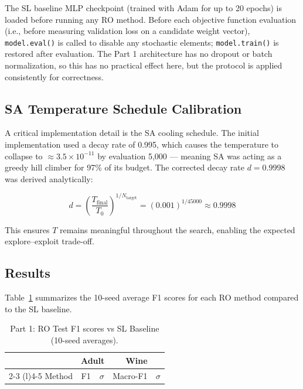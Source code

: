 \documentclass[letterpaper, 10 pt, conference]{ieeeconf}
\begin{document}
The SL baseline MLP checkpoint (trained with Adam for up to 20 epochs) is loaded before running any RO method. Before each objective function evaluation (i.e., before measuring validation loss on a candidate weight vector), \texttt{model.eval()} is called to disable any stochastic elements; \texttt{model.train()} is restored after evaluation. The Part 1 architecture has no dropout or batch normalization, so this has no practical effect here, but the protocol is applied consistently for correctness.

\subsection{SA Temperature Schedule Calibration}

A critical implementation detail is the SA cooling schedule. The initial implementation used a decay rate of 0.995, which causes the temperature to collapse to $\approx 3.5 \times 10^{-11}$ by evaluation 5{,}000 --- meaning SA was acting as a greedy hill climber for 97\% of its budget. The corrected decay rate $d = 0.9998$ was derived analytically:

\begin{equation}
d = \left(\frac{T_{\text{final}}}{T_0}\right)^{1/N_{\text{target}}} = (0.001)^{1/45000} \approx 0.9998
\end{equation}

This ensures $T$ remains meaningful throughout the search, enabling the expected explore--exploit trade-off.

\subsection{Results}

Table~\ref{tab:part1} summarizes the 10-seed average F1 scores for each RO method compared to the SL baseline.

\begin{table}[!htbp]
    \centering
    \caption{Part 1: RO Test F1 scores vs SL Baseline (10-seed averages).}
    \label{tab:part1}
    \setlength{\tabcolsep}{3pt}
    \begin{tabular}{@{}lcccc@{}}
    \toprule
    & \multicolumn{2}{c}{\textbf{Adult}} & \multicolumn{2}{c}{\textbf{Wine}} \\
    \cmidrule(lr){2-3} \cmidrule(l){4-5}
    Method & F1 & $\sigma$ & Macro-F1 & $\sigma$ \\
    \midrule
    
    \bottomrule
    \end{tabular}
\end{table}
\end{document}
